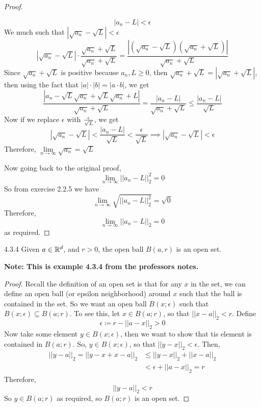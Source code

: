 \documentclass[openany]{report}
\begin{document}
\begin{proof}
\begin{itemize}
        \[|a_n - L| < \epsilon\]
        We much such that $|\sqrt{a_n} - \sqrt{L}| < \epsilon$
        \[|\sqrt{a_n} - \sqrt{L}| \cdot \frac{\sqrt{a_n} + \sqrt{L}}{\sqrt{a_n} + \sqrt{L}} = \frac{|(\sqrt{a_n} - \sqrt{L})(\sqrt{a_n} + \sqrt{L})|}{\sqrt{a_n} + \sqrt{L}}\]
        Since $\sqrt{a_n} + \sqrt{L}$ is positive because $a_n, L \geq 0$, then $\sqrt{a_n} + \sqrt{L} = |\sqrt{a_n} + \sqrt{L}|$, then using the fact that $|a|\cdot|b| = |a\cdot b|$, we get 
        \[\frac{|a_n - \sqrt{L}\sqrt{a_n} + \sqrt{L}\sqrt{a_n} + L|}{\sqrt{a_n} + \sqrt{L}} = \frac{|a_n - L|}{\sqrt{a_n} + \sqrt{L}} \leq \frac{|a_n - L|}{\sqrt{L}}\]
        Now if we replace $\epsilon$ with $\epsilon \over \sqrt{L}$, we get 
        \[|\sqrt{a_n} - \sqrt{L}| < \frac{|a_n - L|}{\sqrt{L}} < \frac{\epsilon}{\sqrt{L}} \implies |\sqrt{a_n} - \sqrt{L}| < \epsilon\]
        Therefore, $\lim\limits_{n\rightarrow\infty}\sqrt{a_n} = \sqrt{L}$
    \end{itemize}
    Now going back to the original proof, 
    \[\lim_{n\rightarrow \infty} ||a_n - L||_2^2 = 0\]
    So from exercise 2.2.5 we have
    \[\lim_{n\rightarrow \infty} \sqrt{||a_n - L||^2_2} = \sqrt{0}\]
    Therefore,
    \[\lim_{n \rightarrow \infty} ||a_n - L||_2 = 0\]
    as required.
\end{proof}

\begin{manualprop}{4.3.4}
    Given $a \in \mathbb{R}^d$, and $r > 0$, the open ball $B(a,r)$ is an open set. 
\end{manualprop}
\begin{center}
    \textbf{Note: This is example 4.3.4 from the professors notes.}
\end{center}
\begin{proof}
    Recall the definition of an open set is that for any $x$ in the set, we can define an open ball (or epsilon neighborhood) around $x$ such that the ball is contained in the set. So we want an open ball $B(x;\epsilon)$ such that $B(x;\epsilon) \subseteq B(a;r)$. To see this, let $x \in B(a;r)$, so that $||x-a||_2 < r$. Define 
    \[\epsilon \coloneqq r - ||a-x||_2 > 0\] 
    Now take some element $y \in B(x;\epsilon)$, then we want to show that tis element is contained in $B(a;r)$. So, $y \in B(x;\epsilon)$, so that $||y-x||_2 < \epsilon$. Then,
    \begin{align*}
        ||y-a||_2 = ||y - x + x -a||_2 &\leq ||y - x||_2 + ||x -a||_2\\
        &< \epsilon + ||a-x||_2 = r
    \end{align*}
    Therefore, 
    \[||y-a||_2 < r\]
    So $y \in B(a;r)$ as required, so $B(a;r)$ is an open set.
\end{proof}
\end{document}
